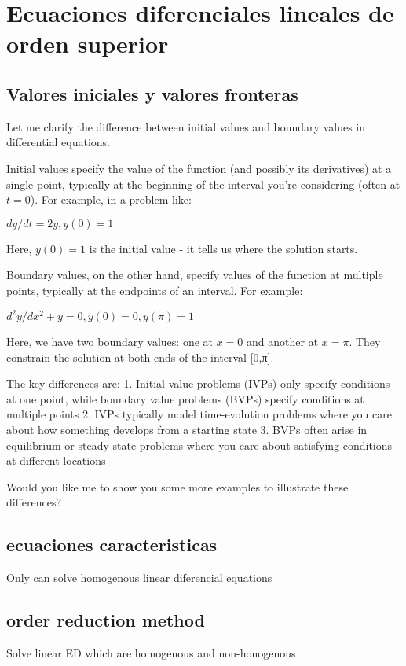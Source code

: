 \chapter{Ecuaciones diferenciales lineales de orden superior}

\section{Valores iniciales y valores fronteras}
Let me clarify the difference between initial values and boundary values in differential equations.

Initial values specify the value of the function (and possibly its derivatives) at a single point, typically at the beginning of the interval you're considering (often at $t=0$). For example, in a problem like:

$dy/dt = 2y, y(0) = 1$

Here, $y(0) = 1$ is the initial value - it tells us where the solution starts.

Boundary values, on the other hand, specify values of the function at multiple points, typically at the endpoints of an interval. For example:

$d^2y/dx^2 + y = 0, y(0) = 0, y(\pi) = 1$

Here, we have two boundary values: one at $x=0$ and another at $x=π$. They constrain the solution at both ends of the interval [0,π].

The key differences are:
1. Initial value problems (IVPs) only specify conditions at one point, while boundary value problems (BVPs) specify conditions at multiple points
2. IVPs typically model time-evolution problems where you care about how something develops from a starting state
3. BVPs often arise in equilibrium or steady-state problems where you care about satisfying conditions at different locations

Would you like me to show you some more examples to illustrate these differences?

\section{ecuaciones caracteristicas}
Only can solve homogenous linear diferencial equations



\section{order reduction method}
Solve linear ED which are homogenous and non-honogenous 


